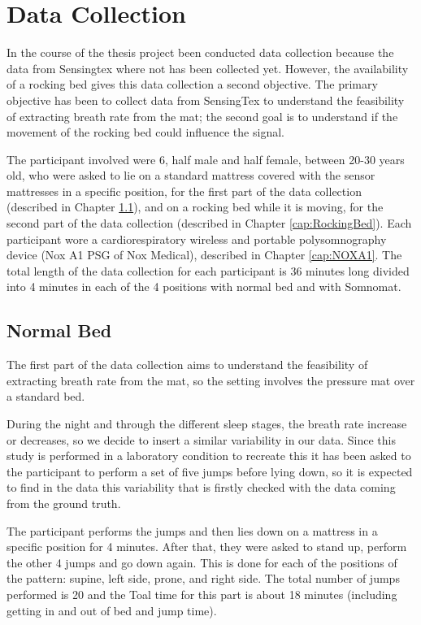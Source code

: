 \section{Data Collection} \label{cap:dataCollection}

In the course of the thesis project been conducted data collection because the data from Sensingtex where not has been collected yet.
However, the availability of a rocking bed gives this data collection a second objective.
The primary objective has been to collect data from SensingTex to understand the feasibility of extracting breath rate from the mat; 
the second goal is to understand if the movement of the rocking bed could influence the signal.

The participant involved were 6, half male and half female, between 20-30 years old, who were asked to lie on a standard mattress covered with the sensor mattresses in a specific position, for the first part of the data collection (described in Chapter \ref{cap:NormalBed}), and on a rocking bed while it is moving, for the second part of the data collection (described in Chapter \ref{cap:RockingBed}).
Each participant wore a cardiorespiratory wireless and portable polysomnography device (Nox A1 PSG of Nox Medical), described in Chapter \ref{cap:NOXA1}. The total length of the data collection for each participant is 36 minutes long divided into 4 minutes in each of the 4 positions with normal bed and with Somnomat.

\subsection{Normal Bed}\label{cap:NormalBed}
The first part of the data collection aims to understand the feasibility of extracting breath rate from the mat, so the setting involves the pressure mat over a standard bed.  

During the night and through the different sleep stages, the breath rate increase or decreases, so we decide to insert a similar variability in our data. Since this study is performed in a laboratory condition to recreate this it has been asked to the participant to perform a set of five jumps before lying down, so it is expected to find in the data this variability that is firstly checked with the data coming from the ground truth.

The participant performs the jumps and then lies down on a mattress in a specific position for 4 minutes.
After that, they were asked to stand up, perform the other 4 jumps and go down again. This is done for each of the positions of the pattern: supine, left side, prone, and right side. The total number of jumps performed is 20 and the Toal time for this part is about 18 minutes (including getting in and out of bed and jump time).

